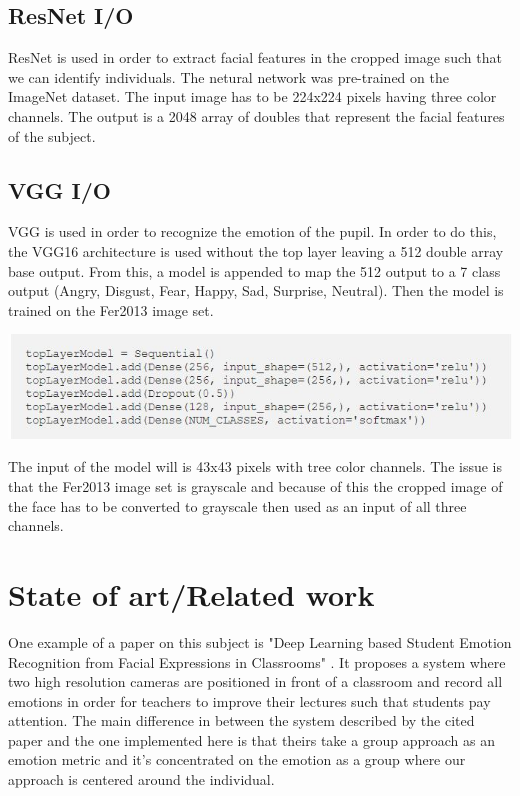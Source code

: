 \documentclass[runningheads,a4paper,11pt]{report}
\begin{document}
\section{ResNet I/O}
\label{section:resNetI/O}
ResNet \cite{HeZRS15} is used in order to extract facial features in the cropped image such that we can identify individuals. The netural network was pre-trained on the ImageNet dataset.
The input image has to be 224x224 pixels having three color channels.
The output is a 2048 array of doubles that represent the facial features of the subject.


\section{VGG I/O}
\label{section:vGGI/O}
VGG \cite{VGG} is used in order to recognize the emotion of the pupil. In order to do this, the VGG16 architecture is used without the top layer leaving a 512 double array base output. From this, a model is appended to map the 512 output to a 7 class output (Angry, Disgust, Fear, Happy, Sad, Surprise, Neutral). Then the model is trained on the Fer2013 image set.

\includegraphics[width=\linewidth]{./Fig/EmotionLayers.JPG}

The input of the model will is 43x43 pixels with tree color channels. The issue is that the Fer2013 image set is grayscale and because of this the cropped image of the face has to be converted to grayscale then used as an input of all three channels. 

\chapter{State of art/Related work}
\label{chapter:stateOfArt}

One example of a paper on this subject is "Deep Learning based Student Emotion Recognition from Facial Expressions in Classrooms" \cite{DLSEC}. It proposes a system where two high resolution cameras are positioned in front of a classroom and record all emotions in order for teachers to improve their lectures such that students pay attention. The main difference in between the system described by the cited paper and the one implemented here is that theirs take a group approach as an emotion metric and it's concentrated on the emotion as a group where our approach is centered around the individual.
\end{document}
